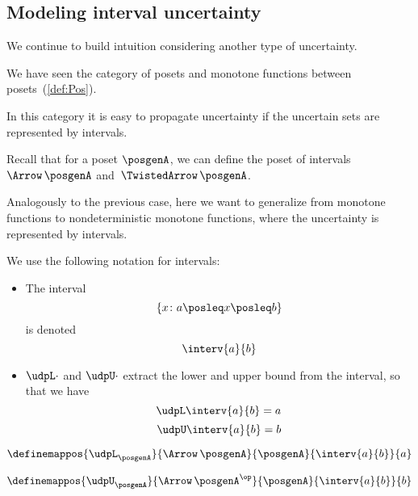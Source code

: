 \subsection{Modeling interval uncertainty}

We continue to build intuition considering another type of uncertainty.

We have seen the category \Pos of posets and monotone functions between posets~(\cref{def:Pos}). 

In this category it is easy to propagate uncertainty if the uncertain sets are represented by intervals. 

Recall that for a poset $\posgenA$, we can define the poset of intervals~$\Arrow\,\posgenA$
and~$\TwistedArrow\,\posgenA$.


Analogously to the previous case, here we want to generalize from monotone functions to nondeterministic monotone functions, where the uncertainty is represented by intervals.

We use the following notation for intervals:
\begin{itemize}
\item The interval
 \begin{equation}\label{eq:interv-1}
    \{x\colon a \posleq x \posleq b\}
 \end{equation}
 is denoted 
 \begin{equation}\label{eq:interv-2}
    \interv{a}{b}
\end{equation}
\item $\udpL\cdot$ and $\udpU\cdot$ extract the lower and upper bound from the interval, so that we have
\begin{equation}\label{eq:interv-L}
    \udpL \interv{a}{b} = a
\end{equation}
\begin{equation}\label{eq:interv-U}
    \udpU \interv{a}{b} = b
\end{equation}
\end{itemize}

\begin{equation}\label{eq:interv-L-def}
    \definemappos{\udpL_{\posgenA}}{\Arrow\,\posgenA}{\posgenA}%
    {\interv{a}{b}}{ a }
\end{equation}

\begin{equation}\label{eq:interv-U-def}
    \definemappos{\udpU_{\posgenA}}{\Arrow\,\posgenA^{\op}}{\posgenA}%
    {\interv{a}{b}}{ b }
\end{equation}


